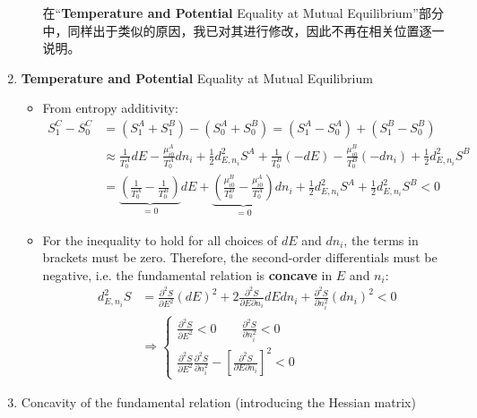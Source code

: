 \begin{thm}
\begin{enumerate}
\begin{itemize}
\begin{zhu}
    在“\textbf{Temperature and Potential} Equality at Mutual Equilibrium”部分中，同样出于类似的原因，我已对其进行修改，因此不再在相关位置逐一说明。
\end{zhu}
        \end{itemize}
        \item \textbf{Temperature and Potential} Equality at Mutual Equilibrium
        \begin{itemize}
            \item From entropy additivity:
            \begin{align*}
                S^C_1 - S^C_0 &= (S^A_1 + S^B_1) - (S^A_0 + S^B_0) = (S^A_1 - S^A_0) + (S^B_1 - S^B_0)\\
                &\approx \frac{1}{T^A_0} dE - \frac{\mu^A_{i0}}{T^A_0} dn_i + \frac{1}{2} d^2_{E,n_i} S^A
                + \frac{1}{T^B_0} (-dE) - \frac{\mu^B_{i0}}{T^B_0} (-dn_i) + \frac{1}{2} d^2_{E,n_i} S^B\\
                &= \underbrace{\left( \frac{1}{T^A_0} - \frac{1}{T^B_0} \right)}_{=0} dE + \underbrace{\left( \frac{\mu^B_{i0}}{T^B_0} 
                - \frac{\mu^A_{i0}}{T^A_0} \right)}_{=0} dn_i + \frac{1}{2} d^2_{E,n_i} S^A + \frac{1}{2} d^2_{E,n_i} S^B < 0
            \end{align*}
                \item For the inequality to hold for all choices of \( dE \) and \( dn_i \), 
                the terms in brackets must be zero. Therefore, the second-order differentials must be negative, 
                i.e. the fundamental relation is \textbf{concave} in \( E \) and \( n_i \):          
\begin{align*}
                d^2_{E,n_i} S &= \frac{\partial^2 S}{\partial E^2} (dE)^2 + 2 \frac{\partial^2 S}{\partial E \partial n_i} dEdn_i + \frac{\partial^2 S}{\partial n_i^2} (dn_i)^2 < 0\\
                &\Rightarrow
                \begin{cases} 
                \frac{\partial^2 S}{\partial E^2} < 0 \qquad \frac{\partial^2 S}{\partial n_i^2} < 0 \\ 
                \frac{\partial^2 S}{\partial E^2} \frac{\partial^2 S}{\partial n_i^2} - \left[ \frac{\partial^2 S}{\partial E \partial n_i} \right]^2 < 0 
                \end{cases}
\end{align*}
        \end{itemize}
    \item Concavity of the fundamental relation (introducing the Hessian matrix)


\end{enumerate}
\end{thm}
